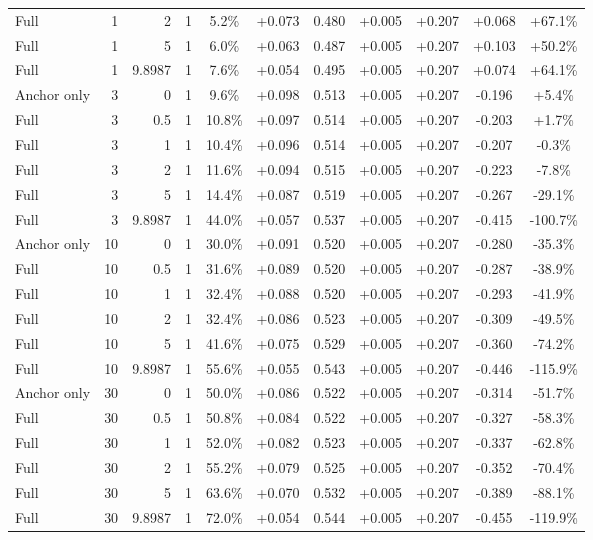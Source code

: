 \begin{table}[htbp]
\begin{tabular}{lrrrccccccc}
Full & 1 & 2 & 1 & 5.2\% & +0.073 & 0.480 & +0.005 & +0.207 & +0.068 & +67.1\% \\
Full & 1 & 5 & 1 & 6.0\% & +0.063 & 0.487 & +0.005 & +0.207 & +0.103 & +50.2\% \\
Full & 1 & 9.8987 & 1 & 7.6\% & +0.054 & 0.495 & +0.005 & +0.207 & +0.074 & +64.1\% \\
Anchor only & 3 & 0 & 1 & 9.6\% & +0.098 & 0.513 & +0.005 & +0.207 & -0.196 & +5.4\% \\
Full & 3 & 0.5 & 1 & 10.8\% & +0.097 & 0.514 & +0.005 & +0.207 & -0.203 & +1.7\% \\
Full & 3 & 1 & 1 & 10.4\% & +0.096 & 0.514 & +0.005 & +0.207 & -0.207 & -0.3\% \\
Full & 3 & 2 & 1 & 11.6\% & +0.094 & 0.515 & +0.005 & +0.207 & -0.223 & -7.8\% \\
Full & 3 & 5 & 1 & 14.4\% & +0.087 & 0.519 & +0.005 & +0.207 & -0.267 & -29.1\% \\
Full & 3 & 9.8987 & 1 & 44.0\% & +0.057 & 0.537 & +0.005 & +0.207 & -0.415 & -100.7\% \\
Anchor only & 10 & 0 & 1 & 30.0\% & +0.091 & 0.520 & +0.005 & +0.207 & -0.280 & -35.3\% \\
Full & 10 & 0.5 & 1 & 31.6\% & +0.089 & 0.520 & +0.005 & +0.207 & -0.287 & -38.9\% \\
Full & 10 & 1 & 1 & 32.4\% & +0.088 & 0.520 & +0.005 & +0.207 & -0.293 & -41.9\% \\
Full & 10 & 2 & 1 & 32.4\% & +0.086 & 0.523 & +0.005 & +0.207 & -0.309 & -49.5\% \\
Full & 10 & 5 & 1 & 41.6\% & +0.075 & 0.529 & +0.005 & +0.207 & -0.360 & -74.2\% \\
Full & 10 & 9.8987 & 1 & 55.6\% & +0.055 & 0.543 & +0.005 & +0.207 & -0.446 & -115.9\% \\
Anchor only & 30 & 0 & 1 & 50.0\% & +0.086 & 0.522 & +0.005 & +0.207 & -0.314 & -51.7\% \\
Full & 30 & 0.5 & 1 & 50.8\% & +0.084 & 0.522 & +0.005 & +0.207 & -0.327 & -58.3\% \\
Full & 30 & 1 & 1 & 52.0\% & +0.082 & 0.523 & +0.005 & +0.207 & -0.337 & -62.8\% \\
Full & 30 & 2 & 1 & 55.2\% & +0.079 & 0.525 & +0.005 & +0.207 & -0.352 & -70.4\% \\
Full & 30 & 5 & 1 & 63.6\% & +0.070 & 0.532 & +0.005 & +0.207 & -0.389 & -88.1\% \\
Full & 30 & 9.8987 & 1 & 72.0\% & +0.054 & 0.544 & +0.005 & +0.207 & -0.455 & -119.9\% \\

\end{tabular}
\end{table}
